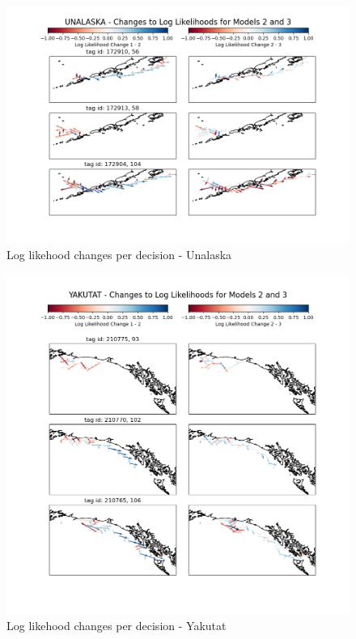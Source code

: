 \documentclass[11pt]{article}
\begin{document}
\begin{figure}[h!] 
	\centering
  \includegraphics[width=140mm]{figures/unalaska_map.png}
  \caption{Log likehood changes per decision - Unalaska}
  \label{fig:unalaska_map}
\end{figure}

\begin{figure}[h!] 
	\centering
  \includegraphics[width=140mm]{figures/yakutat_map.png}
  \caption{Log likehood changes per decision - Yakutat}
  \label{fig:yakutat_map}
\end{figure}
\end{document}

